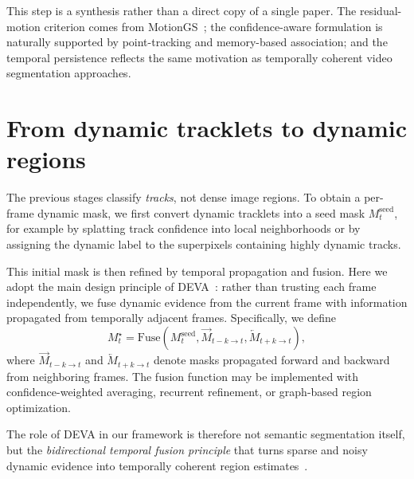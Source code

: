 \documentclass[11pt]{article}
\begin{document}
This step is a synthesis rather than a direct copy of a single paper. The residual-motion criterion comes from MotionGS~\cite{motiongs2024}; the confidence-aware formulation is naturally supported by point-tracking and memory-based association; and the temporal persistence reflects the same motivation as temporally coherent video segmentation approaches.

\section{From dynamic tracklets to dynamic regions}
The previous stages classify \emph{tracks}, not dense image regions. To obtain a per-frame dynamic mask, we first convert dynamic tracklets into a seed mask $M_t^{\mathrm{seed}}$, for example by splatting track confidence into local neighborhoods or by assigning the dynamic label to the superpixels containing highly dynamic tracks.

This initial mask is then refined by temporal propagation and fusion. Here we adopt the main design principle of DEVA~\cite{deva2023}: rather than trusting each frame independently, we fuse dynamic evidence from the current frame with information propagated from temporally adjacent frames. Specifically, we define
\begin{equation}
 M_t^{\star} = \mathrm{Fuse}\!\left(
 M_t^{\mathrm{seed}},
 \overrightarrow{M}_{t-k\rightarrow t},
 \overleftarrow{M}_{t+k\rightarrow t}
 \right),
\end{equation}
where $\overrightarrow{M}_{t-k\rightarrow t}$ and $\overleftarrow{M}_{t+k\rightarrow t}$ denote masks propagated forward and backward from neighboring frames. The fusion function may be implemented with confidence-weighted averaging, recurrent refinement, or graph-based region optimization.

The role of DEVA in our framework is therefore not semantic segmentation itself, but the \emph{bidirectional temporal fusion principle} that turns sparse and noisy dynamic evidence into temporally coherent region estimates~\cite{deva2023}.
\end{document}
